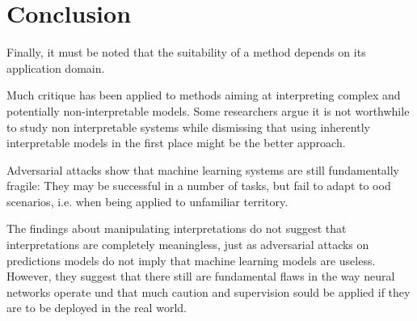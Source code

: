 \section{Conclusion}
Finally, it must be noted that the suitability of a method depends on its application domain. 


Much critique has been applied to methods aiming at interpreting complex and potentially non-interpretable models. 
Some researchers argue it is not worthwhile to study non interpretable systems while dismissing that using inherently interpretable models in the first place might be the better approach. 

Adversarial attacks show that machine learning systems are still fundamentally fragile: They may be successful in a number of tasks, but fail to adapt to ood scenarios, i.e. when being applied to unfamiliar territory. 

 The findings about manipulating interpretations do not suggest that interpretations are completely meaningless, just as adversarial attacks on predictions models do not imply that machine learning models are useless. However, they suggest that there still are fundamental flaws in the way neural networks operate und that much caution and supervision sould be applied if they are to be deployed in the real world. 
